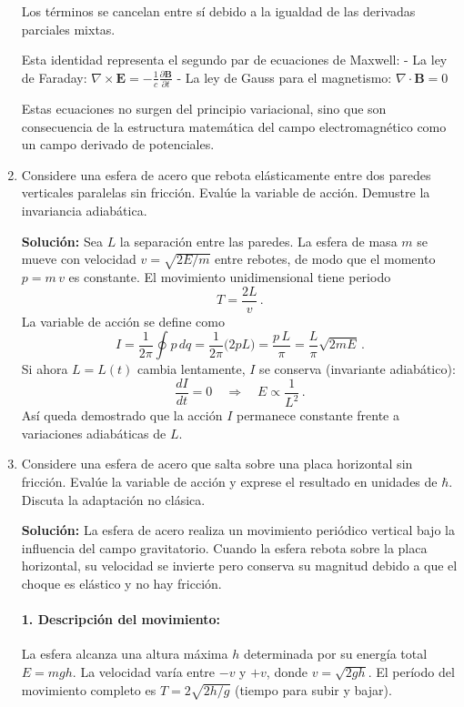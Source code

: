 \documentclass[12pt]{article}
\begin{document}
\begin{enumerate}
  Los términos se cancelan entre sí debido a la igualdad de las derivadas parciales mixtas.

  Esta identidad representa el segundo par de ecuaciones de Maxwell:
  - La ley de Faraday: $\nabla \times \mathbf{E} = -\frac{1}{c}\frac{\partial \mathbf{B}}{\partial t}$
  - La ley de Gauss para el magnetismo: $\nabla \cdot \mathbf{B} = 0$

  Estas ecuaciones no surgen del principio variacional, sino que son consecuencia de la estructura matemática del campo electromagnético como un campo derivado de potenciales.

  \item Considere una esfera de acero que rebota elásticamente entre dos paredes verticales paralelas sin fricción. Evalúe la variable de acción. Demustre la invariancia adiabática.
  
  \textbf{Solución:}  
  Sea $L$ la separación entre las paredes. La esfera de masa $m$ se mueve con velocidad $v=\sqrt{2E/m}$ entre rebotes, de modo que el momento $p=m\,v$ es constante. El movimiento unidimensional tiene periodo 
  \[
  T=\frac{2L}{v}\,.
  \]
  La variable de acción se define como
  \[
  I=\frac{1}{2\pi}\oint p\,dq
  =\frac{1}{2\pi}\bigl(2pL\bigr)
  =\frac{p\,L}{\pi}
  =\frac{L}{\pi}\sqrt{2mE}\,.
  \]
  Si ahora $L=L(t)$ cambia lentamente, $I$ se conserva (invariante adiabático):
  \[
  \frac{dI}{dt}=0
  \quad\Longrightarrow\quad
  E\propto\frac{1}{L^2}\,.
  \]
  Así queda demostrado que la acción $I$ permanece constante frente a variaciones adiabáticas de $L$.
  \item Considere una esfera de acero que salta sobre una placa horizontal sin fricción. Evalúe la variable de acción y exprese el resultado en unidades de \(\hbar\). Discuta la adaptación no clásica.
  
  \textbf{Solución:}
  La esfera de acero realiza un movimiento periódico vertical bajo la influencia del campo gravitatorio. Cuando la esfera rebota sobre la placa horizontal, su velocidad se invierte pero conserva su magnitud debido a que el choque es elástico y no hay fricción.

  \paragraph{1. Descripción del movimiento:}
  La esfera alcanza una altura máxima $h$ determinada por su energía total $E = mgh$. La velocidad varía entre $-v$ y $+v$, donde $v = \sqrt{2gh}$. El período del movimiento completo es $T = 2\sqrt{2h/g}$ (tiempo para subir y bajar).


\end{enumerate}
\end{document}
